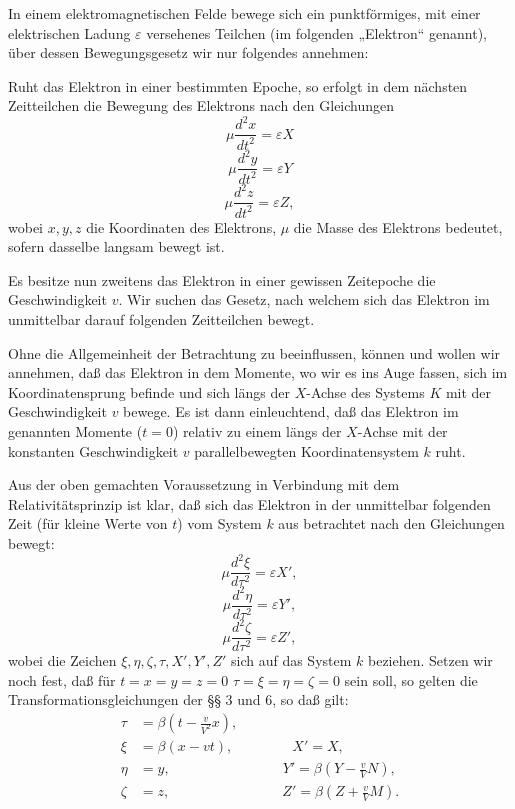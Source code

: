 \documentclass[17pt]{webarticle}       %
\begin{document}
In einem elektromagnetischen Felde bewege sich ein punktförmiges, mit einer elektrischen Ladung \( \varepsilon \) versehenes Teilchen (im folgenden „Elektron“ genannt), über dessen Bewegungsgesetz wir nur folgendes annehmen:

Ruht das Elektron in einer bestimmten Epoche, so erfolgt in dem nächsten Zeitteilchen die Bewegung des Elektrons nach den Gleichungen
\[
\mu \frac{d^2 x}{dt^2} = \varepsilon X
\]
\[
\mu \frac{d^2 y}{dt^2} = \varepsilon Y
\]
\[
\mu \frac{d^2 z}{dt^2} = \varepsilon Z,
\]
wobei \( x, y, z \) die Koordinaten des Elektrons, \( \mu \) die Masse des Elektrons bedeutet, sofern dasselbe langsam bewegt ist.

Es besitze nun zweitens das Elektron in einer gewissen Zeitepoche die Geschwindigkeit \( v \). Wir suchen das Gesetz, nach welchem sich das Elektron im unmittelbar darauf folgenden Zeitteilchen bewegt.

Ohne die Allgemeinheit der Betrachtung zu beeinflussen, können und wollen wir annehmen, daß das Elektron in dem Momente, wo wir es ins Auge fassen, sich im Koordinatensprung befinde und sich längs der \( X \)-Achse des Systems \( K \) mit der Geschwindigkeit \( v \) bewege. Es ist dann einleuchtend, daß das Elektron im genannten Momente (\( t = 0 \)) relativ zu einem längs der \( X \)-Achse mit der konstanten Geschwindigkeit \( v \) parallelbewegten Koordinatensystem \( k \) ruht.

Aus der oben gemachten Voraussetzung in Verbindung mit dem Relativitätsprinzip ist klar, daß sich das Elektron in der unmittelbar folgenden Zeit (für kleine Werte von \( t \)) vom System \( k \) aus betrachtet nach den Gleichungen bewegt:
\[
\mu \frac{d^2 \xi}{d \tau^2} = \varepsilon X',
\]
\[
\mu \frac{d^2 \eta}{d \tau^2} = \varepsilon Y',
\]
\[
\mu \frac{d^2 \zeta}{d \tau^2} = \varepsilon Z',
\]
wobei die Zeichen \( \xi, \eta, \zeta, \tau, X', Y', Z' \) sich auf das System \( k \) beziehen. Setzen wir noch fest, daß für \( t = x = y = z = 0 \) \( \tau = \xi = \eta = \zeta = 0 \) sein soll, so gelten die Transformationsgleichungen der §§ 3 und 6, so daß gilt:
\[
\begin{align*}
\tau &= \beta \left( t - \frac{v}{V^2} x \right),
\\
\xi &= \beta (x - vt), \qquad \qquad \ X' = X,
\\
\eta &= y, \qquad \qquad \qquad \qquad Y' = \beta \left( Y - \frac{v}{V} N \right),
\\
\zeta &= z, \qquad \qquad \qquad \qquad Z' = \beta \left( Z + \frac{v}{V} M \right).
\end{align*}
\]
\end{document}
